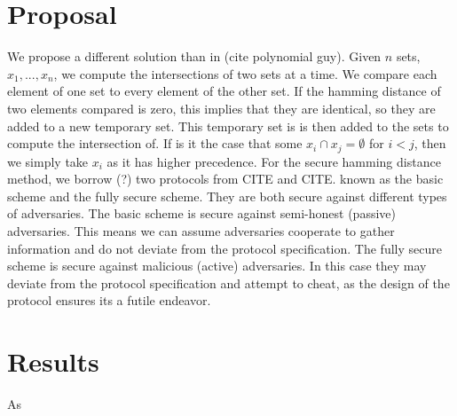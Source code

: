 \documentclass[12pt]{article}
\begin{document}
\section{Proposal}
We propose a different solution than in (cite polynomial guy). Given $n$ sets, $x_1,...,x_n$, we compute the intersections of two sets at a time. We compare each element of one set to every element of the other set. If the hamming distance of two elements compared is zero, this implies that they are identical, so they are added to a new temporary set. This temporary set is is then added to the sets to compute the intersection of. If is it the case that some $x_i \cap x_j = \emptyset$ for $i  < j$, then we simply take $x_i$ as it has higher precedence. For the secure hamming distance method, we borrow (?) two protocols from CITE and CITE. known as the basic scheme and the fully secure scheme. They are both secure against different types of adversaries. The basic scheme is secure against semi-honest (passive) adversaries. This means we can assume adversaries cooperate to gather information and do not deviate from the protocol specification. The fully secure scheme is secure against malicious (active) adversaries. In this case they may deviate from the protocol specification and attempt to cheat, as the design of the protocol ensures its a futile endeavor. 


\section{Results}
As
\end{document}
